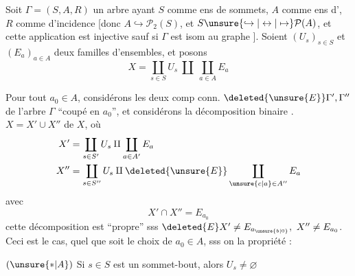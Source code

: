 Soit  $\Gamma=(S,A,R)$ un arbre ayant $S$ comme ens de sommets, $A$ \unsure{-} comme ens d', $R$ comme  d'incidence [donc
$A\hookrightarrow\mathcal{P}_2(S)$, et $S\unsure{\hookrightarrow|\leftrightarrow|\mapsto}\mathcal{P}(A)$, et cette application est injective sauf si $\Gamma$ est isom au graphe
\diagram{\begin{tikzcd}[ampersand replacement=\&,column sep=1.4em]
\bullet \arrow[r,dash] \& \bullet
\end{tikzcd}}
]. Soient $(U_s)_{s\in S}$ et $(E_a)_{a\in A}$ deux familles d'ensembles, et posons
\[
X=\coprod_{s\in S}U_s\ \amalg\ \coprod_{a\in A}E_a
\]

Pour tout $a_0\in A$, considérons les deux comp conn. $\deleted{\unsure{E}}\Gamma',\Gamma''$ de l'arbre $\Gamma$ ``coupé en $a_0$'', et considérons la décomposition binaire . $X=X'\cup X''$ de $X$,
où
\[
\begin{aligned}
X'&=\coprod_{s\in S'}U_s\amalg\coprod_{a\in A'}E_a\\
X''&=\coprod_{s\in S''}U_s\amalg\deleted{\unsure{E}}\coprod_{\unsure{c|a}\in A''}E_a
\end{aligned}
\]
avec
\[
X'\cap X''=E_{a_0}
\]
cette décomposition est ``propre'' sss $\deleted{E}X'\ne E_{a_{\unsure{b|0}}},\ X''\ne E_{a_0}$. Ceci est le cas, quel que soit le choix de $a_0\in A$, sss on  la propriété  :

$(\unsure{\ast|A})$ Si $s\in S$ est un sommet-bout, alors $U_s\ne\varnothing$
